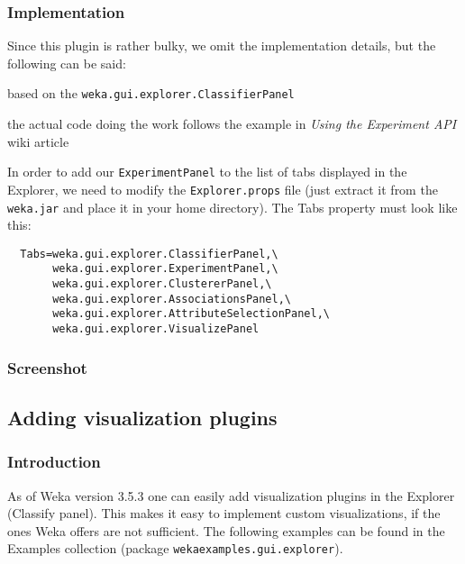 \subsubsection*{Implementation}
\begin{tight_itemize}
  \item Since this plugin is rather bulky, we omit the implementation details,
but the following can be said:
  \begin{tight_itemize}
	\item based on the \texttt{weka.gui.explorer.ClassifierPanel}
	\item the actual code doing the work follows the example in \textit{Using
the Experiment API} wiki article \cite{wekawiki}
  \end{tight_itemize}
  \item In order to add our \texttt{ExperimentPanel} to the list of tabs
displayed in the Explorer, we need to modify the \texttt{Explorer.props} file
(just extract it from the \texttt{weka.jar} and place it in your home
directory). The Tabs property must look like this:
  \begin{verbatim}
  Tabs=weka.gui.explorer.ClassifierPanel,\
       weka.gui.explorer.ExperimentPanel,\
       weka.gui.explorer.ClustererPanel,\
       weka.gui.explorer.AssociationsPanel,\
       weka.gui.explorer.AttributeSelectionPanel,\
       weka.gui.explorer.VisualizePanel
  \end{verbatim}
\end{tight_itemize}

\subsubsection*{Screenshot}
\begin{center}
\end{center}

\newpage
\subsection{Adding visualization plugins}
\subsubsection*{Introduction}
As of Weka version 3.5.3 one can easily add visualization plugins in the
Explorer (Classify panel). This makes it easy to implement custom
visualizations, if the ones Weka offers are not sufficient. The following
examples can be found in the Examples collection \cite{wekaexamples} (package
\texttt{wekaexamples.gui.explorer}).

